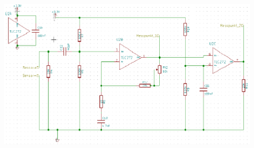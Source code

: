 \begin{center}
\begin{minipage}{0.75\textwidth}
\includegraphics[width=1\textwidth%
]{Abbildungen/Empfaenger.png}
\label{fig:Empfaengerschaltung}
\end{minipage}\\
\end{center}
